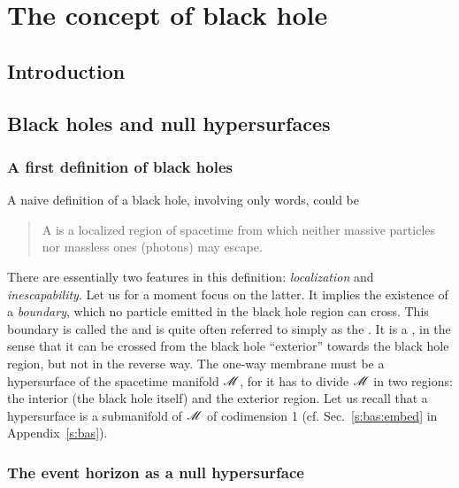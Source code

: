 \chapter{The concept of black hole}

\minitoc

\section{Introduction}



\section{Black holes and null hypersurfaces}

\subsection{A first definition of black holes} \label{s:def:first_defin}

A naive definition of a black hole, involving only words, could be
\begin{quote}
A  is a localized region of spacetime
from which neither massive particles nor massless ones (photons) may escape.
\end{quote}
There are essentially two features in this definition: \emph{localization}
and \emph{inescapability}. Let us for a moment focus on the latter.
It implies the existence of a \emph{boundary}, which no
particle emitted in the black hole region can cross.
This boundary is called the
 and is
quite often referred to simply as the .
It is a ,
in the sense that it can be crossed from the black hole ``exterior'' towards
the black hole region, but not in the reverse way. The one-way membrane must be
a hypersurface of the spacetime manifold $\mathscr{M}$, for it has to divide $\mathscr{M}$ in two regions:
the interior (the black hole itself) and the exterior region.
Let us recall that a hypersurface is a submanifold of $\mathscr{M}$ of codimension 1
(cf. Sec.~\ref{s:bas:embed} in Appendix~\ref{s:bas}).

\subsection{The event horizon as a null hypersurface}


